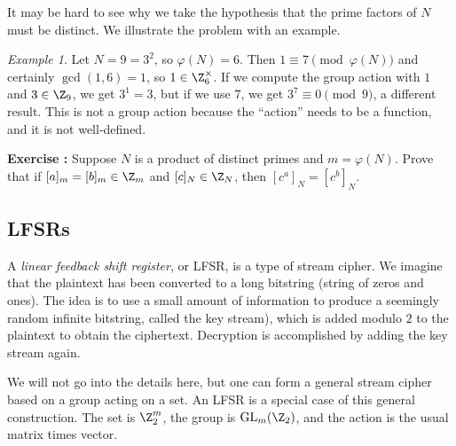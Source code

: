 \documentclass[12pt]{amsart}
\DeclareMathOperator{\GL}{GL}
\newcounter{probs}
\newenvironment{prob}{%
  \refstepcounter{probs}
  \par\medskip\noindent\textbf{Exercise \theprobs:} }{\par\medskip}
\theoremstyle{plain}
\theoremstyle{definition}
\theoremstyle{remark}
\newtheorem*{exam}{Example}
\begin{document}
It may be hard to see why we take the hypothesis that the prime
factors of $N$ must be distinct.  We illustrate the problem with an
example.
\begin{exam}
  Let $N=9=3^2$, so $\varphi(N) = 6$.  Then $1\equiv 7
  \pmod{\varphi(N)}$ and certainly $\gcd(1,6)=1$, so $1\in
  \Z_6^\times$.  If we compute the group action with $1$ and
  $3\in\Z_9$, we get $3^1=3$, but if we use $7$, we get $3^7\equiv
  0\pmod 9$, a different result.  This is not a group action because
  the ``action'' needs to be a function, and it is not well-defined.
\end{exam} 
\begin{prob}
  Suppose $N$ is a product of distinct primes and $m=\varphi(N)$.
  Prove that if $[a]_m=[b]_m\in\Z_m$ and $[c]_N\in\Z_N$, then $[c^a]_N=[c^b]_N$. 
\end{prob}

\subsection{LFSRs}

A \emph{linear feedback shift register}, or LFSR, is a type of stream
cipher.  We imagine that the plaintext has been converted to a long
bitstring (string of zeros and ones).  The idea is to use a small
amount of information to produce a seemingly random infinite
bitstring, called the key stream), which is added modulo $2$ to the
plaintext to obtain the ciphertext.  Decryption is accomplished by
adding the key stream again.

We will not go into the details here, but one can form a general
stream cipher based on a group acting on a set.  An LFSR is a special
case of this general construction.  The set is $\Z_2^m$, the group
is $\GL_m(\Z_2)$, and the action is the usual matrix times vector.

\end{document}

